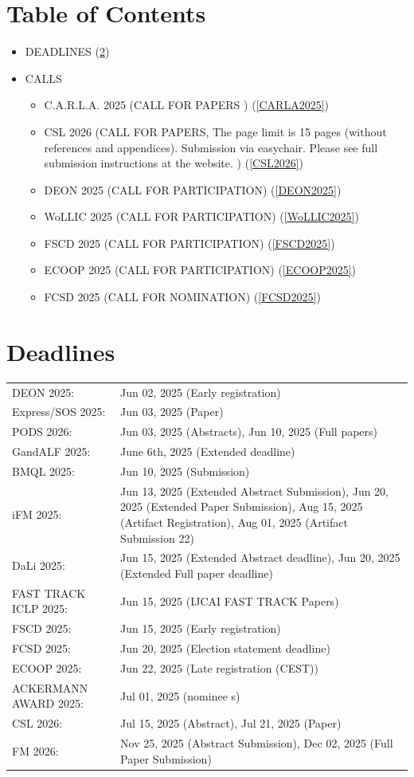 \documentclass[prodmode,acmtecs]{acmsmall} %
\begin{document}
\section{Table of Contents}\begin{itemize}\item DEADLINES (\cref{deadlines}) 
 
\item CALLS 
 
\begin{itemize}\item C.A.R.L.A. 2025 (CALL FOR PAPERS ) (\cref{CARLA2025})
\item CSL 2026 (CALL FOR PAPERS, The page limit is 15  pages (without references and appendices). Submission via easychair. Please see full submission instructions at the website. ) (\cref{CSL2026})
\item DEON 2025 (CALL FOR PARTICIPATION) (\cref{DEON2025})
\item WoLLIC 2025 (CALL FOR PARTICIPATION) (\cref{WoLLIC2025})
\item FSCD 2025 (CALL FOR PARTICIPATION) (\cref{FSCD2025})
\item ECOOP 2025 (CALL FOR PARTICIPATION) (\cref{ECOOP2025})
\item FCSD 2025 (CALL FOR NOMINATION) (\cref{FCSD2025})
\end{itemize} 
\end{itemize}\section{Deadlines}\label{deadlines}\begin{tabulary}{\linewidth}{LL}DEON 2025:  & Jun 02, 2025 (Early registration) \\
Express/SOS 2025:  & Jun 03, 2025 (Paper) \\
PODS 2026:  & Jun 03, 2025 (Abstracts), Jun 10, 2025 (Full papers) \\
GandALF 2025:  & June 6th, 2025 (Extended deadline) \\
BMQL 2025:  & Jun 10, 2025 (Submission) \\
iFM 2025:  & Jun 13, 2025 (Extended Abstract Submission), Jun 20, 2025 (Extended Paper Submission), Aug 15, 2025 (Artifact Registration), Aug 01, 2025 (Artifact Submission 22) \\
DaLi 2025:  & Jun 15, 2025 (Extended Abstract deadline), Jun 20, 2025 (Extended Full paper deadline) \\
FAST TRACK ICLP 2025:  & Jun 15, 2025 (IJCAI FAST TRACK Papers) \\
FSCD 2025:  & Jun 15, 2025 (Early registration) \\
FCSD 2025:  & Jun 20, 2025 (Election statement deadline) \\
ECOOP 2025:  & Jun 22, 2025 (Late registration (CEST)) \\
ACKERMANN AWARD 2025:  & Jul 01, 2025 (nominee s) \\
CSL 2026:  & Jul 15, 2025 (Abstract), Jul 21, 2025 (Paper) \\
FM 2026:  & Nov 25, 2025 (Abstract Submission), Dec 02, 2025 (Full Paper Submission) \\
\end{tabulary}
\end{document}
